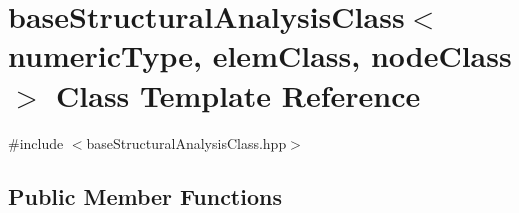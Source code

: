 \hypertarget{classbase_structural_analysis_class}{}\section{base\+Structural\+Analysis\+Class$<$ numeric\+Type, elem\+Class, node\+Class $>$ Class Template Reference}
\label{classbase_structural_analysis_class}


{\ttfamily \#include $<$base\+Structural\+Analysis\+Class.\+hpp$>$}

\subsection*{Public Member Functions}
